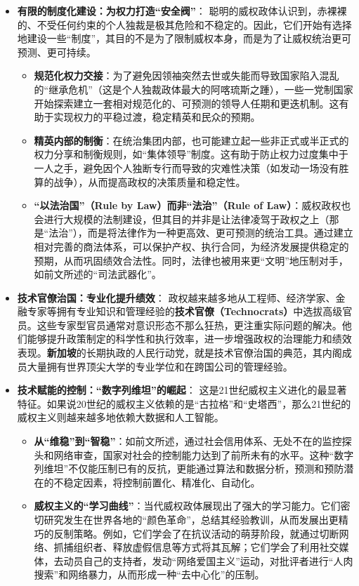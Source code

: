 \begin{itemize}
    \item \textbf{有限的制度化建设：为权力打造“安全阀”}：
    聪明的威权政体认识到，赤裸裸的、不受任何约束的个人独裁是极其危险和不稳定的。因此，它们开始有选择地建设一些“制度”，其目的不是为了限制威权本身，而是为了让威权统治更可预测、更可持续。
    \begin{itemize}
        \item \textbf{规范化权力交接}：为了避免因领袖突然去世或失能而导致国家陷入混乱的“继承危机”（这是个人独裁政体最大的阿喀琉斯之踵），一些一党制国家开始探索建立一套相对规范化的、可预测的领导人任期和更迭机制。这有助于实现权力的平稳过渡，稳定精英和民众的预期。
        \item \textbf{精英内部的制衡}：在统治集团内部，也可能建立起一些非正式或半正式的权力分享和制衡规则，如“集体领导”制度。这有助于防止权力过度集中于一人之手，避免因个人独断专行而导致的灾难性决策（如发动一场没有胜算的战争），从而提高政权的决策质量和稳定性。
        \item \textbf{“以法治国”（Rule by Law）而非“法治”（Rule of Law）}：威权政权也会进行大规模的法制建设，但其目的并非是让法律凌驾于政权之上（那是“法治”），而是将法律作为一种更高效、更可预测的统治工具。通过建立相对完善的商法体系，可以保护产权、执行合同，为经济发展提供稳定的预期，从而巩固绩效合法性。同时，法律也被用来更“文明”地压制对手，如前文所述的“司法武器化”。
    \end{itemize}
    \item \textbf{技术官僚治国：专业化提升绩效}：
    政权越来越多地从工程师、经济学家、金融专家等拥有专业知识和管理经验的\textbf{技术官僚（Technocrats）}中选拔高级官员。这些专家型官员通常对意识形态不那么狂热，更注重实际问题的解决。他们能够提升政策制定的科学性和执行效率，进一步增强政权的治理能力和绩效表现。\textbf{新加坡}的长期执政的人民行动党，就是技术官僚治国的典范，其内阁成员大量拥有世界顶尖大学的专业学位和在跨国公司的管理经验。
    \item \textbf{技术赋能的控制：“数字列维坦”的崛起}：
    这是21世纪威权主义进化的最显著特征。如果说20世纪的威权主义依赖的是“古拉格”和“史塔西”，那么21世纪的威权主义则越来越多地依赖大数据和人工智能。
    \begin{itemize}
        \item \textbf{从“维稳”到“智稳”}：如前文所述，通过社会信用体系、无处不在的监控探头和网络审查，国家对社会的控制能力达到了前所未有的水平。这种“数字列维坦”不仅能压制已有的反抗，更能通过算法和数据分析，预测和预防潜在的不稳定因素，将控制前置化、精准化、自动化。
        \item \textbf{威权主义的“学习曲线”}：当代威权政体展现出了强大的学习能力。它们密切研究发生在世界各地的“颜色革命”，总结其经验教训，从而发展出更精巧的反制策略。例如，它们学会了在抗议活动的萌芽阶段，就通过切断网络、抓捕组织者、释放虚假信息等方式将其瓦解；它们学会了利用社交媒体，去动员自己的支持者，发动“网络爱国主义”运动，对批评者进行“人肉搜索”和网络暴力，从而形成一种“去中心化”的压制。

\end{itemize}
\end{itemize}
